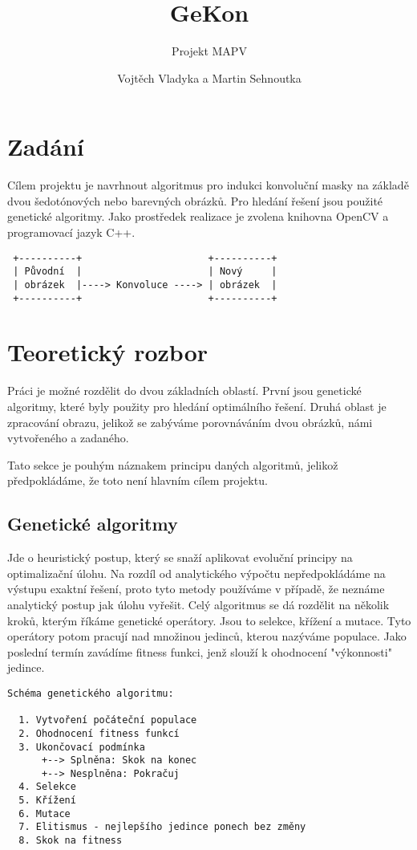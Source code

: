 \documentclass[a4paper,11pt]{scrartcl}
\title{GeKon}
\subtitle{Projekt MAPV}
\author{Vojtěch Vladyka a Martin Sehnoutka}
\begin{document}
\maketitle
\tableofcontents

\section{Zadání}
Cílem projektu je navrhnout algoritmus pro indukci konvoluční masky na základě dvou šedotónových nebo barevných obrázků. Pro hledání řešení jsou použité genetické algoritmy. Jako prostředek realizace je zvolena knihovna OpenCV a programovací jazyk C++.

\begin{verbatim}
 +----------+                      +----------+
 | Původní  |                      | Nový     |
 | obrázek  |----> Konvoluce ----> | obrázek  |
 +----------+                      +----------+
\end{verbatim}

\section{Teoretický rozbor}

Práci je možné rozdělit do dvou základních oblastí. První jsou genetické algoritmy, které byly použity pro hledání optimálního řešení. Druhá oblast je zpracování obrazu, jelikož se zabýváme porovnáváním dvou obrázků, námi vytvořeného a zadaného.

Tato sekce je pouhým náznakem principu daných algoritmů, jelikož předpokládáme, že toto není hlavním cílem projektu.

\subsection{Genetické algoritmy}

Jde o heuristický postup, který se snaží aplikovat evoluční principy na optimalizační úlohu. Na rozdíl od analytického výpočtu nepředpokládáme na výstupu exaktní řešení, proto tyto metody používáme v případě, že neznáme analytický postup jak úlohu vyřešit. Celý algoritmus se dá rozdělit na několik kroků, kterým říkáme genetické operátory. Jsou to selekce, křížení a mutace. Tyto operátory potom pracují nad množinou jedinců, kterou nazýváme populace. Jako poslední termín zavádíme fitness funkci, jenž slouží k ohodnocení "výkonnosti" jedince.

\begin{verbatim}
Schéma genetického algoritmu:

  1. Vytvoření počáteční populace
  2. Ohodnocení fitness funkcí
  3. Ukončovací podmínka
      +--> Splněna: Skok na konec 
      +--> Nesplněna: Pokračuj
  4. Selekce
  5. Křížení
  6. Mutace
  7. Elitismus - nejlepšího jedince ponech bez změny
  8. Skok na fitness
\end{verbatim}
\end{document}
